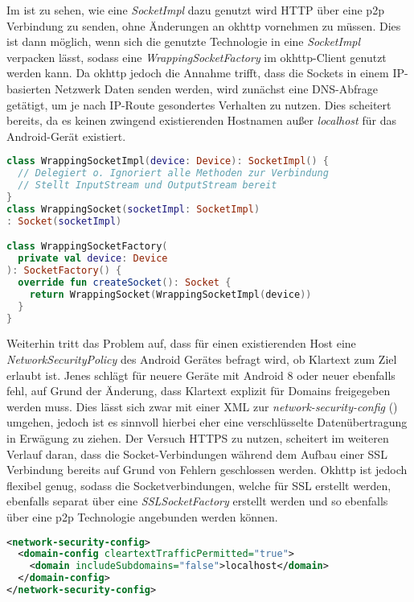         Im  ist zu sehen, wie eine {\it SocketImpl} dazu genutzt wird HTTP über eine p2p Verbindung zu senden, ohne Änderungen an okhttp vornehmen zu müssen. Dies ist dann möglich, wenn sich die genutzte Technologie in eine {\it SocketImpl} verpacken lässt, sodass eine {\it WrappingSocketFactory} im okhttp-Client genutzt werden kann. Da okhttp jedoch die Annahme trifft, dass die Sockets in einem IP-basierten Netzwerk Daten senden werden, wird zunächst eine DNS-Abfrage getätigt, um je nach IP-Route gesondertes Verhalten zu nutzen. Dies scheitert bereits, da es keinen zwingend existierenden Hostnamen außer {\it localhost} für das Android-Gerät existiert.
        \begin{lstlisting}[frame=bt, label={lst:android:socketfactory}, language=Kotlin, caption=HTTP-Kapselung als SocketFactory (Clientcode in Kotlin)]
class WrappingSocketImpl(device: Device): SocketImpl() {
  // Delegiert o. Ignoriert alle Methoden zur Verbindung
  // Stellt InputStream und OutputStream bereit
}
class WrappingSocket(socketImpl: SocketImpl)
: Socket(socketImpl)

class WrappingSocketFactory(
  private val device: Device
): SocketFactory() {
  override fun createSocket(): Socket {
    return WrappingSocket(WrappingSocketImpl(device))
  }
}
        \end{lstlisting}        
        
        Weiterhin tritt das Problem auf, dass für einen existierenden Host eine {\it NetworkSecurityPolicy} des Android Gerätes befragt wird, ob Klartext zum Ziel erlaubt ist. Jenes schlägt für neuere Geräte mit Android 8 oder neuer ebenfalls fehl, auf Grund der Änderung, dass Klartext explizit für Domains freigegeben werden muss. Dies lässt sich zwar mit einer XML zur {\it network-security-config} () umgehen, jedoch ist es sinnvoll hierbei eher eine verschlüsselte Datenübertragung in Erwägung zu ziehen. Der Versuch HTTPS zu nutzen, scheitert im weiteren Verlauf daran, dass die Socket-Verbindungen während dem Aufbau einer SSL Verbindung bereits auf Grund von Fehlern geschlossen werden. Okhttp ist jedoch flexibel genug, sodass die Socketverbindungen, welche für SSL erstellt werden, ebenfalls separat über eine {\it SSLSocketFactory} erstellt werden und so ebenfalls über eine p2p Technologie angebunden werden können.
        
        \begin{lstlisting}[frame=bt, label={lst:android:networksecurity}, language=XML, caption=Sicherheitskonfiguration für erlaube Klartexthosts (Clientcode in XML)]
<network-security-config>
  <domain-config cleartextTrafficPermitted="true">
    <domain includeSubdomains="false">localhost</domain>
  </domain-config>
</network-security-config>
        \end{lstlisting}
        
